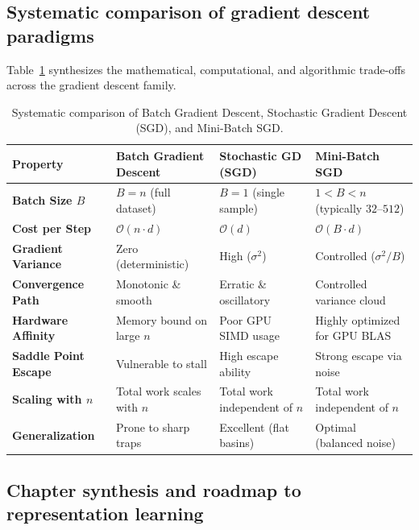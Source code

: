 \subsection{Systematic comparison of gradient descent paradigms}
\label{sec:systematic_comparison}

Table~\ref{tab:gradient_comparison} synthesizes the mathematical, computational, and algorithmic trade-offs across the gradient descent family.

\begin{table}[htbp]
\centering
\small
\renewcommand{\arraystretch}{0.90}
\caption{Systematic comparison of Batch Gradient Descent, Stochastic Gradient Descent (SGD), and Mini-Batch SGD.}
\label{tab:gradient_comparison}
\begin{tabularx}{\textwidth}{lXXX}
\toprule
\textbf{Property} & \textbf{Batch Gradient Descent} & \textbf{Stochastic GD (SGD)} & \textbf{Mini-Batch SGD} \\

\midrule
\textbf{Batch Size $B$} & $B = n$ (full dataset) & $B = 1$ (single sample) & $1 < B < n$ (typically $32$--$512$) \\
\textbf{Cost per Step} & $\mathcal{O}(n \cdot d)$ & $\mathcal{O}(d)$ & $\mathcal{O}(B \cdot d)$ \\
\textbf{Gradient Variance} & Zero (deterministic) & High ($\sigma^2$) & Controlled ($\sigma^2 / B$) \\
\textbf{Convergence Path} & Monotonic \& smooth & Erratic \& oscillatory & Controlled variance cloud \\
\textbf{Hardware Affinity} & Memory bound on large $n$ & Poor GPU SIMD usage & Highly optimized for GPU BLAS \\
\textbf{Saddle Point Escape} & Vulnerable to stall & High escape ability & Strong escape via noise \\
\textbf{Scaling with $n$} & Total work scales with $n$ & Total work independent of $n$ & Total work independent of $n$ \\
\textbf{Generalization} & Prone to sharp traps & Excellent (flat basins) & Optimal (balanced noise) \\
\bottomrule
\end{tabularx}
\end{table}

\subsection{Chapter synthesis and roadmap to representation learning}
\label{sec:chapter3_synthesis}

